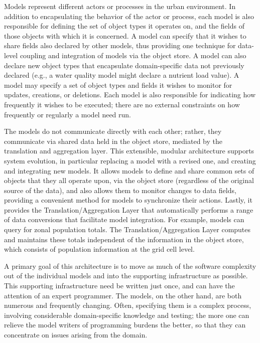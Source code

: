 \documentclass[fleqn]{article}
\begin{document}
Models represent different actors or processes in the urban
environment. In addition to encapsulating the behavior of the
actor or process, each model is also responsible for defining the
set of object types it operates on, and the fields of those
objects with which it is concerned.  A model can specify that it
wishes to share fields also declared by other models, thus
providing one technique for data-level coupling and integration of
models via the object store.  A model can also declare new object
types that encapsulate domain-specific data not previously
declared (e.g., a water quality model might declare a nutrient
load value).  A model may specify a set of object types and fields
it wishes to monitor for updates, creations, or deletions.  Each
model is also responsible for indicating how frequently it wishes
to be executed; there are no external constraints on how
frequently or regularly a model need run.

The models do not communicate directly with each other; rather,
they communicate via shared data held in the object store,
mediated by the translation and aggregation layer. This
extensible, modular architecture supports system evolution, in
particular replacing a model with a revised one, and creating and
integrating new models. It allows models to define and share
common sets of objects that they all operate upon, via the object
store (regardless of the original source of the data), and also
allows them to monitor changes to data fields, providing a
convenient method for models to synchronize their actions.
Lastly, it provides the Translation/Aggregation Layer that
automatically performs a range of data conversions that facilitate
model integration.  For example, models can query for zonal
population totals. The Translation/Aggregation Layer computes and
maintains these totals independent of the information in the
object store, which consists of population information at the grid
cell level.

A primary goal of this architecture is to move as much of the
software complexity out of the individual models and into the
supporting infrastructure as possible.  This supporting
infrastructure need be written just once, and can have the
attention of an expert programmer.  The models, on the other hand,
are both numerous and frequently changing.  Often, specifying them
is a complex process, involving considerable domain-specific
knowledge and testing; the more one can relieve the model writers
of programming burdens the better, so that they can concentrate on
issues arising from the domain.
\end{document}
